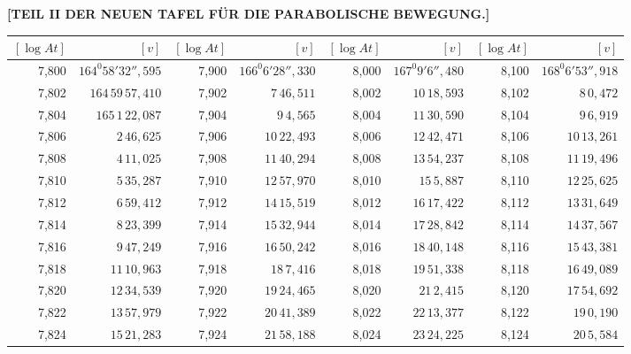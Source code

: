 \clearpage
{}
\begingroup
\centering
\fontsize{9}{9}\selectfont
\setlength{\tabcolsep}{.2pt}
\renewcommand{\arraystretch}{.9}
\setlength{\parskip}{0pt}
\textbf{[TEIL II DER NEUEN TAFEL FÜR DIE PARABOLISCHE BEWEGUNG.]}
\par\vspace{7pt}
\begin{tabular}{|r|r||r|r||r|r||r|r|}
\hline
\([\log At]\) & \([v]\) & \([\log At]\) & \([v]\) & \([\log At]\) & \([v]\) & \([\log At]\) & \([v]\) \\
\hline
7,800 & \(164^{0}58'32'',\!595\) & 7,900 & \(166^{0}6'28'',\!330\) & 8,000 & \(167^{0}9'6'',\!480\) & 8,100 & \(168^{0}6'53'',\!918\) \\[1pt]
7,802 & \(164\,59\,57,\!410\) & 7,902 & \(7\,46,\!511\) & 8,002 & \(10\,18,\!593\) & 8,102 & \(8\,0,\!472\) \\
7,804 & \(165\,1\,22,\!087\) & 7,904 & \(9\,4,\!565\) & 8,004 & \(11\,30,\!590\) & 8,104 & \(9\,6,\!919\) \\
7,806 & \(2\,46,\!625\) & 7,906 & \(10\,22,\!493\) & 8,006 & \(12\,42,\!471\) & 8,106 & \(10\,13,\!261\) \\
7,808 & \(4\,11,\!025\) & 7,908 & \(11\,40,\!294\) & 8,008 & \(13\,54,\!237\) & 8,108 & \(11\,19,\!496\) \\
7,810 & \(5\,35,\!287\) & 7,910 & \(12\,57,\!970\) & 8,010 & \(15\,5,\!887\) & 8,110 & \(12\,25,\!625\) \\[1pt]
7,812 & \(6\,59,\!412\) & 7,912 & \(14\,15,\!519\) & 8,012 & \(16\,17,\!422\) & 8,112 & \(13\,31,\!649\) \\
7,814 & \(8\,23,\!399\) & 7,914 & \(15\,32,\!944\) & 8,014 & \(17\,28,\!842\) & 8,114 & \(14\,37,\!567\) \\
7,816 & \(9\,47,\!249\) & 7,916 & \(16\,50,\!242\) & 8,016 & \(18\,40,\!148\) & 8,116 & \(15\,43,\!381\) \\
7,818 & \(11\,10,\!963\) & 7,918 & \(18\,7,\!416\) & 8,018 & \(19\,51,\!338\) & 8,118 & \(16\,49,\!089\) \\
7,820 & \(12\,34,\!539\) & 7,920 & \(19\,24,\!465\) & 8,020 & \(21\,2,\!415\) & 8,120 & \(17\,54,\!692\) \\[1pt]
7,822 & \(13\,57,\!979\) & 7,922 & \(20\,41,\!389\) & 8,022 & \(22\,13,\!377\) & 8,122 & \(19\,0,\!190\) \\
7,824 & \(15\,21,\!283\) & 7,924 & \(21\,58,\!188\) & 8,024 & \(23\,24,\!225\) & 8,124 & \(20\,5,\!584\) \\

\end{tabular}
